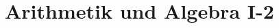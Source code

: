 \part{Arithmetik und Algebra I-2}
\renewcommand{\bbwPartID}{AA1-2}
%
%
%
%

%
%


\newpage

\newpage
